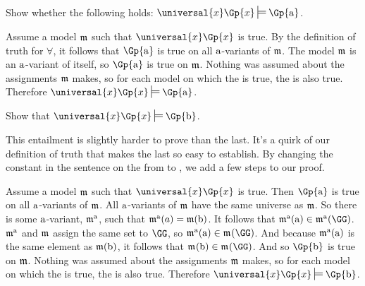 \begin{majorILnc}{}
	Show whether the following holds: $\universal{\variable{x}}\Gp{\variable{x}}\sdtstile{}{}\Gp{\constant{a}}$.
\end{majorILnc}
\begin{PROOF}
	Assume a model $\mathfrak{m}$ such that $\universal{\variable{x}}\Gp{\variable{x}}$ is true.
	By the definition of truth for $\forall$, it follows that $\Gp{\constant{a}}$ is true on all $\mathrm{a}$-variants of $\mathfrak{m}$.
	The model $\mathfrak{m}$ is an $\mathrm{a}$-variant of itself, so $\Gp{\constant{a}}$ is true on $\mathfrak{m}$.
	Nothing was assumed about the assignments $\mathfrak{m}$ makes, so for each model on which the  is true, the  is also true.
	Therefore $\universal{\variable{x}}\Gp{\variable{x}}\sdtstile{}{}\Gp{\constant{a}}$.
\end{PROOF}
\begin{majorILnc}{}
	Show that $\universal{\variable{x}}\Gp{\variable{x}}\sdtstile{}{}\Gp{\constant{b}}$.
	\begin{commentary}
		This entailment is slightly harder to prove than the last.
		It's a quirk of our definition of truth that makes the last so easy to establish.
		By changing the constant in the sentence on the  from  to , we add a few steps to our proof.
	\end{commentary}
\end{majorILnc}
\begin{PROOF}
	Assume a model $\mathfrak{m}$ such that $\universal{\variable{x}}\Gp{\variable{x}}$ is true.
	Then $\Gp{\constant{a}}$ is true on all $\mathrm{a}$-variants of $\mathfrak{m}$.
	All $\mathrm{a}$-variants of $\mathfrak{m}$ have the same universe as $\mathfrak{m}$.
	So there is some $\mathrm{a}$-variant, $\mathfrak{m^{\mathrm{\mathrm{a}}}_{\mathrm{}}}$, such that $\mathfrak{m^{\mathrm{\mathrm{a}}}_{\mathrm{}}}(a)=\mathfrak{m}(\mathrm{b})$.
	It follows that $\As{\constant{a}}{}(\constant{a})\in\As{\constant{a}}{}(\GG)$.
	$\mathfrak{m^{\mathrm{\mathrm{a}}}_{\mathrm{}}}$ and $\mathfrak{m}$ assign the same set to $\GG$, so $\As{\constant{a}}{}(\constant{a})\in\As{}{}(\GG)$.
	And because $\mathfrak{m^{\mathrm{\mathrm{a}}}_{\mathrm{}}}(\mathrm{a})$ is the same element as $\mathfrak{m}(\mathrm{b})$, it follows that $\As{}{}(\constant{b})\in\As{}{}(\GG)$.
	And so $\Gp{\constant{b}}$ is true on $\mathfrak{m}$.
	Nothing was assumed about the assignments $\mathfrak{m}$ makes, so for each model on which the  is true, the  is also true.
	Therefore $\universal{\variable{x}}\Gp{\variable{x}}\sdtstile{}{}\Gp{\constant{b}}$.
\end{PROOF}

